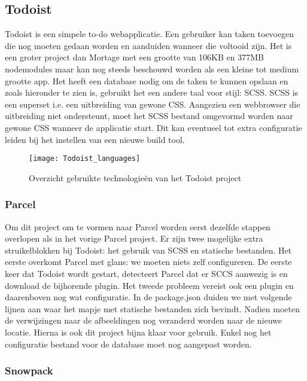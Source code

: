\subsection{Todoist}

Todoist \autocite{hadwen-2021} is een simpele to-do webapplicatie. Een gebruiker kan taken toevoegen die nog moeten gedaan worden en aanduiden wanneer die voltooid zijn. Het is een groter project dan Mortage met een grootte van 106KB en 377MB nodemodules maar kan nog steeds beschouwd worden als een kleine tot medium grootte app. Het heeft een database nodig om de taken te kunnen opslaan en zoals hieronder te zien is, gebruikt het een andere taal voor stijl: SCSS. SCSS is een superset i.e. een uitbreiding van gewone CSS. Aangezien een webbrowser die uitbreiding niet ondersteunt, moet het SCSS bestand omgevormd worden naar gewone CSS wanneer de applicatie start. Dit kan eventueel tot extra configuratie leiden bij het instellen van een nieuwe build tool. 

\begin{figure}[h]
    \texttt{[image: Todoist\_languages]}
        \centering
        \caption[]{Overzicht gebruikte technologieën van het Todoist project}
    \end{figure}

\subsubsection{Parcel}

Om dit project om te vormen naar Parcel worden eerst dezelfde stappen overlopen als in het vorige Parcel project. Er zijn twee mogelijke extra struikelblokken bij Todoist: het gebruik van SCSS en statische bestanden. Het eerste overkomt Parcel met glans: we moeten niets zelf configureren. De eerste keer dat Todoist wordt gestart, detecteert Parcel dat er SCCS aanwezig is en download de bijhorende plugin. Het tweede probleem vereist ook een plugin en daarenboven nog wat configuratie. In de package.json duiden we met volgende lijnen aan waar het mapje met statische bestanden zich bevindt. Nadien moeten de verwijzingen naar de afbeeldingen nog veranderd worden naar de nieuwe locatie. Hierna is ook dit project bijna klaar voor gebruik. Enkel nog het configuratie bestand voor de database moet nog aangepast worden.

\subsubsection{Snowpack}

